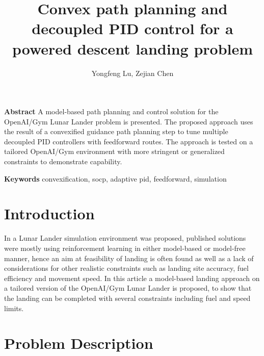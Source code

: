 \documentclass[notitlepage,twocolumn,10pt]{article}
\begin{document}
\abovedisplayskip=3pt
\abovedisplayshortskip=3pt
\belowdisplayskip=0pt
\belowdisplayshortskip=0pt
\abovecaptionskip=0pt
\belowcaptionskip=0pt

\title{Convex path planning and decoupled PID control for a powered descent landing problem}
\author{Yongfeng Lu, Zejian Chen}
\date{} %

\maketitle

\smallskip
\footnotesize
\noindent \textbf{Abstract} A model-based path planning and control solution for the OpenAI/Gym Lunar Lander problem\cite{openaigym} is presented. The proposed approach uses the result of a convexified guidance path planning step to tune multiple decoupled PID controllers with feedforward routes. The approach is tested on a tailored OpenAI/Gym environment with more stringent or generalized constraints to demonstrate capability. 

\smallskip
\textbf{Keywords} convexification, socp, adaptive pid, feedforward, simulation  
\normalsize %

\section{Introduction} \label{sec:intro}
In \cite{openaigym} a Lunar Lander simulation environment was proposed, published solutions were mostly using reinforcement learning in either model-based or model-free manner\cite{yudeep, gadgil2020solving, peters2019dynamic}, hence an aim at feasibility of landing is often found as well as a lack of considerations for other realistic constraints such as landing site accuracy, fuel efficiency and movement speed. In this article a model-based landing approach on a tailored version of the OpenAI/Gym Lunar Lander is proposed, to show that the landing can be completed with several constraints including fuel and speed limits.      

\section{Problem Description} 
\end{document}
